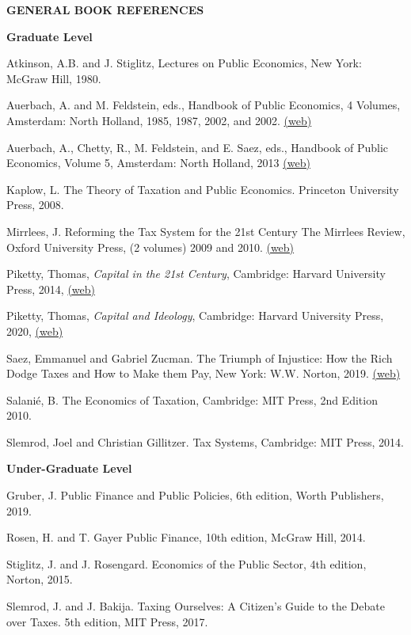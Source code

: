 \documentclass[landscape]{slides}
\begin{document}
\begin{slide}
\begin{center}
{\bf GENERAL BOOK REFERENCES}
\end{center}
{\small

\textbf{Graduate Level}

Atkinson, A.B. and J. Stiglitz, Lectures on Public Economics, New York: McGraw Hill, 1980.

Auerbach, A. and M. Feldstein, eds., Handbook of Public Economics, 4 Volumes, Amsterdam: North Holland, 1985, 1987, 2002, and 2002.
\href{http://www.sciencedirect.com/science/handbooks/15734420/} {(web)}

Auerbach, A., Chetty, R., M. Feldstein, and E. Saez, eds., Handbook of Public Economics, Volume 5,
Amsterdam: North Holland, 2013
\href{http://www.sciencedirect.com/science/handbooks/15734420/} {(web)}

Kaplow, L. The Theory of Taxation and Public Economics.  Princeton University Press, 2008.

Mirrlees, J. Reforming the Tax System for the 21st Century The Mirrlees Review, Oxford University Press, (2 volumes) 2009 and 2010.
\href{https://www.ifs.org.uk/publications/mirrleesreview} {(web)}

Piketty, Thomas, \emph{Capital in the 21st Century},  Cambridge: Harvard University Press, 2014,   
\href{http://piketty.pse.ens.fr/en/capital21c2}{(web)}

Piketty, Thomas, \emph{Capital and Ideology},  Cambridge: Harvard University Press, 2020,   
\href{http://piketty.pse.ens.fr/en/ideology}{(web)}

Saez, Emmanuel and Gabriel Zucman. The Triumph of Injustice: How the Rich Dodge Taxes and How to Make them Pay, New York: W.W. Norton, 2019. 
\href{http://www.taxjusticenow.org} {(web)}

Salani\'e, B. The Economics of Taxation, Cambridge: MIT Press, 2nd Edition 2010.

Slemrod, Joel and Christian Gillitzer. Tax Systems, Cambridge: MIT Press, 2014.



\pagebreak

\textbf{Under-Graduate Level}

Gruber, J. Public Finance and Public Policies, 6th edition, Worth Publishers, 2019.

Rosen, H. and T. Gayer Public Finance, 10th edition, McGraw Hill, 2014.

Stiglitz, J. and J. Rosengard. Economics of the Public Sector,  4th edition, Norton, 2015.

Slemrod, J. and J. Bakija. Taxing Ourselves: A Citizen's Guide to the Debate over Taxes. 5th edition, MIT Press, 2017.

}

\end{slide}
\end{document}
